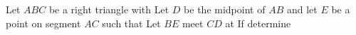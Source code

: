 Let $ ABC$ be a right triangle with  Let $ D$ be the midpoint of $ AB$ and let $ E$ be a point on segment $ AC$ such that  Let $ BE$ meet $ CD$ at  If  determine 